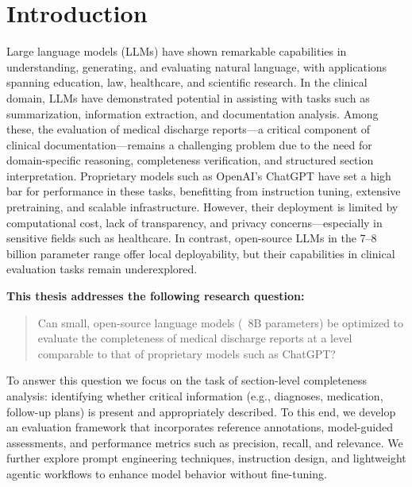\section{Introduction}
Large language models (LLMs) have shown remarkable capabilities in understanding, 
generating, and evaluating natural language, with applications spanning education, 
law, healthcare, and scientific research.\cite{p0}
In the clinical domain, LLMs have demonstrated potential in assisting with tasks 
such as summarization, information extraction, and documentation analysis. 
Among these, the evaluation of medical discharge reports—a critical component of 
clinical documentation—remains a challenging problem due to the need for 
domain-specific reasoning, completeness verification, 
and structured section interpretation.
Proprietary models such as OpenAI’s ChatGPT have set a high bar for performance 
in these tasks, benefitting from instruction tuning, extensive pretraining, and 
scalable infrastructure. 
However, their deployment is limited by computational cost, lack of transparency, 
and privacy concerns—especially in sensitive fields such as healthcare. 
In contrast, open-source LLMs in the 7–8 billion parameter range offer local 
deployability, but their capabilities in clinical evaluation tasks remain underexplored.

\vspace{2\baselineskip}

\textbf{This thesis addresses the following research question:}

\begin{quote}
Can small, open-source language models (~8B parameters) be optimized to evaluate the completeness of medical discharge reports at a level comparable to that of proprietary models such as ChatGPT?
\end{quote}

To answer this question we focus on the task of section-level completeness analysis: 
identifying whether critical information (e.g., diagnoses, medication, follow-up plans) 
is present and appropriately described. 
To this end, we develop an evaluation framework that incorporates reference annotations, 
model-guided assessments, and performance metrics such as precision, recall, and relevance.
We further explore prompt engineering techniques, instruction design, 
and lightweight agentic workflows to enhance model behavior without fine-tuning. 

\clearpage

